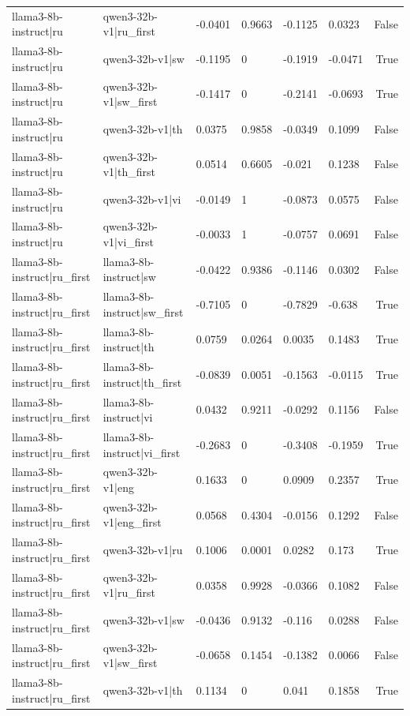 \begin{table}
\begin{tabular}{llllllr}
llama3-8b-instruct|ru & qwen3-32b-v1|ru_first & -0.0401 & 0.9663 & -0.1125 & 0.0323 & False \\
llama3-8b-instruct|ru & qwen3-32b-v1|sw & -0.1195 & 0 & -0.1919 & -0.0471 & True \\
llama3-8b-instruct|ru & qwen3-32b-v1|sw_first & -0.1417 & 0 & -0.2141 & -0.0693 & True \\
llama3-8b-instruct|ru & qwen3-32b-v1|th & 0.0375 & 0.9858 & -0.0349 & 0.1099 & False \\
llama3-8b-instruct|ru & qwen3-32b-v1|th_first & 0.0514 & 0.6605 & -0.021 & 0.1238 & False \\
llama3-8b-instruct|ru & qwen3-32b-v1|vi & -0.0149 & 1 & -0.0873 & 0.0575 & False \\
llama3-8b-instruct|ru & qwen3-32b-v1|vi_first & -0.0033 & 1 & -0.0757 & 0.0691 & False \\
llama3-8b-instruct|ru_first & llama3-8b-instruct|sw & -0.0422 & 0.9386 & -0.1146 & 0.0302 & False \\
llama3-8b-instruct|ru_first & llama3-8b-instruct|sw_first & -0.7105 & 0 & -0.7829 & -0.638 & True \\
llama3-8b-instruct|ru_first & llama3-8b-instruct|th & 0.0759 & 0.0264 & 0.0035 & 0.1483 & True \\
llama3-8b-instruct|ru_first & llama3-8b-instruct|th_first & -0.0839 & 0.0051 & -0.1563 & -0.0115 & True \\
llama3-8b-instruct|ru_first & llama3-8b-instruct|vi & 0.0432 & 0.9211 & -0.0292 & 0.1156 & False \\
llama3-8b-instruct|ru_first & llama3-8b-instruct|vi_first & -0.2683 & 0 & -0.3408 & -0.1959 & True \\
llama3-8b-instruct|ru_first & qwen3-32b-v1|eng & 0.1633 & 0 & 0.0909 & 0.2357 & True \\
llama3-8b-instruct|ru_first & qwen3-32b-v1|eng_first & 0.0568 & 0.4304 & -0.0156 & 0.1292 & False \\
llama3-8b-instruct|ru_first & qwen3-32b-v1|ru & 0.1006 & 0.0001 & 0.0282 & 0.173 & True \\
llama3-8b-instruct|ru_first & qwen3-32b-v1|ru_first & 0.0358 & 0.9928 & -0.0366 & 0.1082 & False \\
llama3-8b-instruct|ru_first & qwen3-32b-v1|sw & -0.0436 & 0.9132 & -0.116 & 0.0288 & False \\
llama3-8b-instruct|ru_first & qwen3-32b-v1|sw_first & -0.0658 & 0.1454 & -0.1382 & 0.0066 & False \\
llama3-8b-instruct|ru_first & qwen3-32b-v1|th & 0.1134 & 0 & 0.041 & 0.1858 & True \\

\end{tabular}
\end{table}
